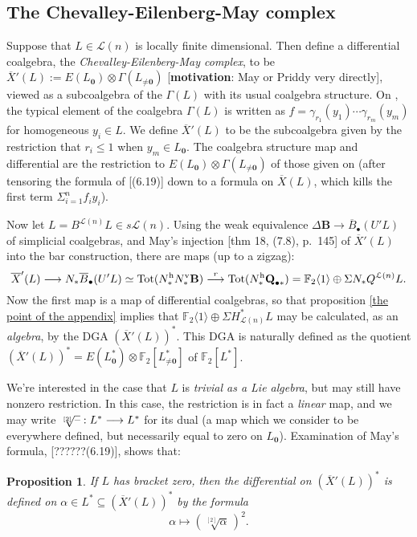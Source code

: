 \documentclass[11pt]{amsart}
\theoremstyle{plain}
\newtheorem{prop}[thm]{Proposition}
\theoremstyle{definition}
\newcommand{\DASH}{\textup{--}}
\renewcommand{\to}{\longrightarrow}
\newcommand{\calL}{\mathcal{L}}
\theoremstyle{plain}
\newcommand{\dualrestn}[1]{\sqrt[{[2]}]{#1}}
\newcommand{\UEA}{U'}%
\newcommand{\UEAX}{\overline{X}'}%
\newcommand{\F}{\mathbb{F}}
\begin{document}
\begin{appendices}
\subsection{The Chevalley-Eilenberg-May complex}
Suppose that $L\in\calL(n)$ is locally finite dimensional. Then define a differential coalgebra, the \emph{Chevalley-Eilenberg-May complex}, to be $\UEAX(L):= E(L_{\textbf{0}})\otimes \Gamma(L_{\neq\textbf{0}})$ [\textbf{motivation}: May or Priddy very directly], viewed as a subcoalgebra of the $\Gamma(L)$ with its usual coalgebra structure. On \cite[p. 141]{MayRestLie.pdf}, the typical element of the coalgebra $\Gamma(L)$ is written as $f=\gamma_{r_1}(y_1)\cdots \gamma_{r_m}(y_m)$ for homogeneous $y_i\in L$. We define $\UEAX(L)$ to be the subcoalgebra given by the restriction that $r_i\leq1$ when $y_m\in L_{\textbf{0}}$. The coalgebra structure map and differential are the restriction to $E(L_{\textbf{0}})\otimes \Gamma(L_{\neq\textbf{0}})$ of those given on \cite[p. 141]{MayRestLie.pdf} (after tensoring the formula of [(6.19)] down to a formula on $\overline{X}(L)$, which kills the first term $\Sigma_{i=1}^nf_iy_i$).

Now let $ L=B^{\calL(n)}L\in s\calL(n)$. Using the weak equivalence $\Delta\textbf{B}\to \overline{B}_\bullet(\UEA L)$ of simplicial coalgebras, and  May's injection [thm 18, (7.8), p.\ 145] of $\UEAX(L)$ into the bar construction, there are maps (up to a zigzag):
\[\UEAX(L)\to N_*\overline{B}_\bullet(U'L)\simeq\textup{Tot}(N^\textup{h}_*N^\textup{v}_*\textbf{B})\overset{r}{\to} \textup{Tot}(N^\textup{h}_*\textbf{Q}_{\bullet*})=\F_2\langle 1\rangle\oplus \Sigma N_*Q^{\calL(n)} L.\]
Now the first map is a map of differential coalgebras, so that proposition \ref{the point of the appendix} implies that $\F_2\langle 1\rangle\oplus \Sigma H^*_{\calL(n)}L$ may be calculated, as an \emph{algebra}, by the DGA $(\UEAX(L))^*$. This DGA is naturally defined as the quotient $(\UEAX(L))^*=E(L^*_{\textbf{0}}) \otimes\F_2[L_{\neq\textbf{0}}^*]$ of $\F_2[L^*]$.

We're interested in the case that $L$ is \emph{trivial as a Lie algebra}, but may still have nonzero restriction. In this case, the restriction is in fact a \emph{linear} map, and we may write $\dualrestn{\DASH}:L^*\to L^*$ for its dual (a map which we consider to be everywhere defined, but necessarily equal to zero on $L_{\textbf{0}}$). Examination of May's formula, [??????(6.19)], shows that:
\begin{prop}
If $L$ has bracket zero, then the differential on $(\UEAX(L))^*$ is defined on $\alpha\in L^*\subseteq (\UEAX(L))^*$ by the formula
\[\alpha\longmapsto (\!\sqrt[{[2]}]{\alpha}\,)^2.\]


\end{prop}
\end{appendices}
\end{document}
